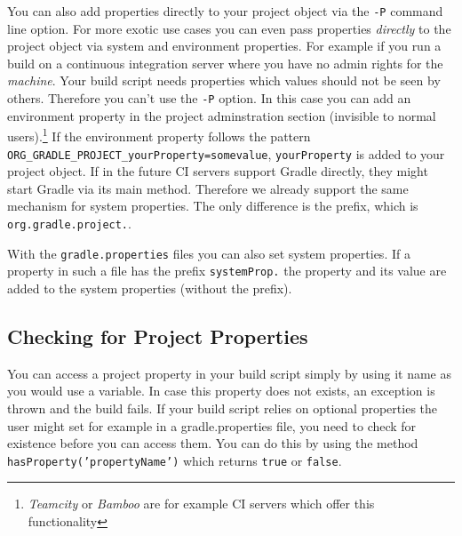 You can also add properties directly to your project object via the \texttt{-P} command line option. For more exotic use cases you can even pass properties \emph{directly} to the project object via system and environment properties. For example if you run a build on a continuous integration server where you have no admin rights for the \emph{machine}. Your build script needs properties which values should not be seen by others. Therefore you can't use the \texttt{-P} option. In this case you can add an environment property in the project adminstration section (invisible to normal users).\footnote{\emph{Teamcity} or \emph{Bamboo} are for example CI servers which offer this functionality} If the environment property follows the pattern \texttt{ORG\_GRADLE\_PROJECT\_yourProperty=somevalue}, \texttt{yourProperty} is added to your project object. If in the future CI servers support Gradle directly, they might start Gradle via its main method. Therefore we already support the same mechanism for system properties. The only difference is the prefix, which is \texttt{org.gradle.project.}.

With the \texttt{gradle.properties} files you can also set system properties. If a property in such a file has the prefix \texttt{systemProp.} the property and its value are added to the system properties (without the prefix).
\subsection{Checking for Project Properties} %
\label{sub:checking_for_project_properties}
You can access a project property in your build script simply by using it name as you would use a variable. In case this property does not exists, an exception is thrown and the build fails. If your build script relies on optional properties the user might set for example in a gradle.properties file, you need to check for existence before you can access them. You can do this by using the method \texttt{hasProperty('propertyName')} which returns \texttt{true} or \texttt{false}.

